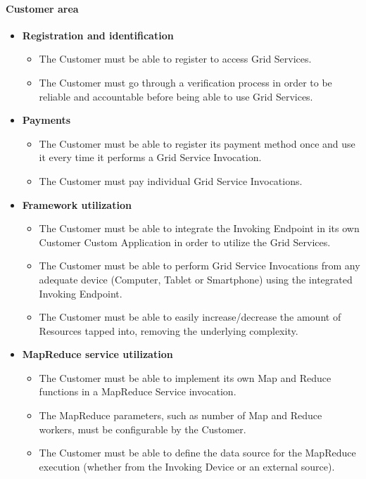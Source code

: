 \paragraph{Customer area}
\begin{itemize}
    \item \textbf{Registration and identification}
    \begin{itemize}
        \item The Customer must be able to register to access Grid Services.
        \item The Customer must go through a verification process in order to be reliable and accountable before being able to use Grid Services.
    \end{itemize}
    \vspace{5mm}
    \item \textbf{Payments}
    \begin{itemize}
        \item The Customer must be able to register its payment method once and use it every time it performs a Grid Service Invocation.
        \item The Customer must pay individual Grid Service Invocations.
    \end{itemize}
    \vspace{5mm}
    \item \textbf{Framework utilization}
    \begin{itemize}
        \item The Customer must be able to integrate the Invoking Endpoint in its own Customer Custom Application in order to utilize the Grid Services.
        \item The Customer must be able to perform Grid Service Invocations from any adequate device (Computer, Tablet or Smartphone) using the integrated Invoking Endpoint.
        \item The Customer must be able to easily increase/decrease the amount of Resources tapped into, removing the underlying complexity.
    \end{itemize}
    \vspace{5mm}
    \item \textbf{MapReduce service utilization}
    \begin{itemize}
        \item The Customer must be able to implement its own Map and Reduce functions in a MapReduce Service invocation.
        \item The MapReduce parameters, such as number of Map and Reduce workers, must be configurable by the Customer.
        \item The Customer must be able to define the data source for the MapReduce execution (whether from the Invoking Device or an external source).
    \end{itemize}
    \vspace{5mm}
\end{itemize}

